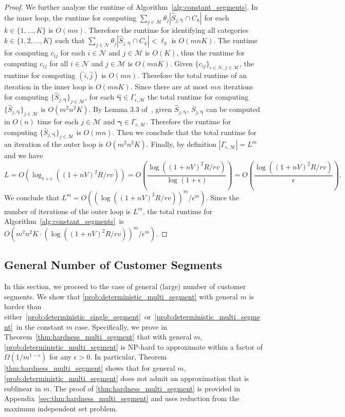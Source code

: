 \documentclass[msom,non-blindrev]{informs3} %
\theoremstyle{definition}
\begin{document}
\begin{proof}
We further analyze the runtime of Algorithm~\ref{alg:constant_segments}. In the inner loop, the runtime for computing $\sum_{j\in\mathcal{M}}\theta_j|\hat{S}_{j,\hat{\boldsymbol{\gamma}}}\cap C_k|$ for each $k\in\{1,\dots,K\}$ is $O(mn)$. Therefore the runtime for identifying all categories $k\in\{1,2,\dots,K\}$ such that $\sum_{j\in\mathcal{N}}\theta_j|\hat{S}_{j,\hat{\boldsymbol{\gamma}}}\cap C_k|<\ell_k$ is $O(mnK)$. The runtime for computing $c_{ij}$ for each $i\in\mathcal{N}$ and $j\in\mathcal{M}$ is $O(K)$, thus the runtime for computing $c_{ij}$ for all $i\in\mathcal{N}$ and $j\in\mathcal{M}$ is $O(mnK)$. Given $\{c_{ij}\}_{i\in\mathcal{N},j\in\mathcal{M}}$, the runtime for computing $(\hat{i},\hat{j})$ is $O(mn)$. Therefore the total runtime of an iteration in the inner loop is $O(mnK)$. Since there are at most $mn$ iterations for computing $\{\hat{S}_{j,\hat{\boldsymbol{\gamma}}}\}_{j\in\mathcal{M}}$, for each $\hat{\boldsymbol{\gamma}}\in\Gamma_{\epsilon,\mathcal{M}}$ the total runtime for computing $\{\hat{S}_{j,\hat{\boldsymbol{\gamma}}}\}_{j\in\mathcal{M}}$ is $O(m^2n^2K)$. By Lemma 3.3 of~\cite{barre2023assortment}, given $\hat{S}_{j,\hat{\boldsymbol{\gamma}}}$, $\bar{S}_{j,\hat{\boldsymbol{\gamma}}}$ can be computed in $O(n)$ time for each $j\in\mathcal{M}$ and $\hat{\boldsymbol{\gamma}}\in\Gamma_{\epsilon,\mathcal{M}}$. Therefore the runtime for computing $\{\bar{S}_{j,\hat{\boldsymbol{\gamma}}}\}_{j\in\mathcal{M}}$ is $O(mn)$. Then we conclude that the total runtime for an iteration of the outer loop is $O(m^2n^2K)$. Finally, by definition $|\Gamma_{\epsilon,\mathcal{M}}|=L^m$ and we have
\begin{equation*}
L=O(\log_{1+\epsilon}((1+nV)^2R/rv))=O\left(\dfrac{\log((1+nV)^2R/rv)}{\log(1+\epsilon)}\right)=O\left(\dfrac{\log((1+nV)^2R/rv)}{\epsilon}\right).
\end{equation*}
We conclude that $L^m=O((\log((1+nV)^2R/rv))^m/\epsilon^m)$. Since the number of iterations of the outer loop is $L^m$, the total runtime for Algorithm~\ref{alg:constant_segments}~is $O(m^2n^2K\cdot(\log((1+nV)^2R/rv))^m/\epsilon^m)$.
\end{proof}

\subsection{General Number of Customer Segments}

In this section, we proceed to the case of general (large) number of customer segments. We show that \eqref{prob:deterministic_multi_segment} with general $m$ is harder than either~\eqref{prob:deterministic_single_segment}~or~\eqref{prob:deterministic_multi_segment}~in the constant $m$ case. Specifically, we prove in Theorem~\ref{thm:hardness_multi_segment} that with general $m$, \eqref{prob:deterministic_multi_segment} is NP-hard to approximate within a factor of $\Omega(1/m^{1-\epsilon})$ for any $\epsilon>0$. In particular, Theorem \ref{thm:hardness_multi_segment} shows that for general $m$, \eqref{prob:deterministic_multi_segment} does not admit an approximation that is sublinear in $m$. The proof of \cref{thm:hardness_multi_segment} is provided in Appendix~\ref{sec:thm:hardness_multi_segment} and uses reduction from the maximum independent set problem.
\end{document}
